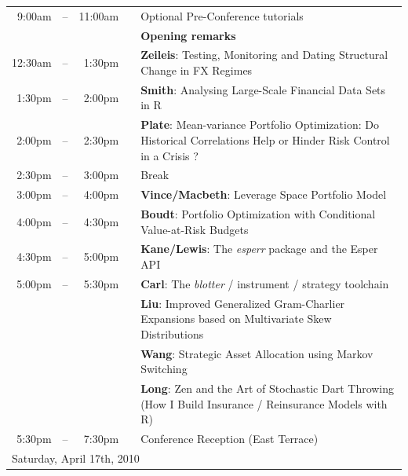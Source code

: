 \documentclass[11pt]{article}
\newcommand{\mylinecolor}[1]{\color{#1}\vspace{-8pt}}  %
\begin{document}
\begin{tabular}{rlrlp{5in}}
  9:00am & -- & 11:00am &   & \small{\mylinecolor{Breaks} Optional Pre-Conference tutorials} \\
  \phantom{X 12:30am}  & \phantom{m} &  & & \textbf{\color{Breaks} Opening remarks} \\
  12:30am& -- & 1:30pm &    & \textbf{\color{KeynoteTalk} Zeileis}: \small{Testing, Monitoring and Dating Structural Change in FX Regimes} \\
  1:30pm & -- & 2:00pm &    & \textbf{\color{Talk} Smith}: \small{Analysing Large-Scale Financial Data Sets in R} \\
  2:00pm & -- & 2:30pm &    & \textbf{\color{Talk} Plate}: \small{Mean-variance Portfolio Optimization: Do Historical Correlations Help or Hinder Risk Control in a Crisis ?} \\[0pt]
  2:30pm & -- & 3:00pm &    & \small{\mylinecolor{Breaks} Break} \\
  3:00pm & -- & 4:00pm &    & \textbf{\color{KeynoteTalk} Vince/Macbeth}: \small{Leverage Space Portfolio Model} \\
  4:00pm & -- & 4:30pm &    & \textbf{\color{Talk} Boudt}: \small{Portfolio Optimization with Conditional Value-at-Risk Budgets} \\
  4:30pm & -- & 5:00pm &    & \textbf{\color{Talk} Kane/Lewis}: \small{The \emph{esperr} package and the Esper API} \\
  5:00pm & -- & 5:30pm &    & \textbf{\color{LightningTalk} Carl}: \small{The \emph{blotter} / instrument / strategy toolchain} \\
         &    &        &    & \textbf{\color{LightningTalk} Liu}: \small{Improved Generalized Gram-Charlier Expansions based on Multivariate Skew Distributions} \\
         &    &        &    & \textbf{\color{LightningTalk} Wang}: \small{Strategic Asset Allocation using Markov Switching} \\
         &    &        &    & \textbf{\color{LightningTalk} Long}: \small{Zen and the Art of Stochastic Dart Throwing (How I Build Insurance / Reinsurance Models with R)} \\[0pt]
  5:30pm & -- & 7:30pm &    & \small{\mylinecolor{Breaks} Conference Reception (East Terrace)}  \\[18pt]

  \multicolumn{5}{l}{\large Saturday, April 17th, 2010} \\


\end{tabular}
\end{document}
